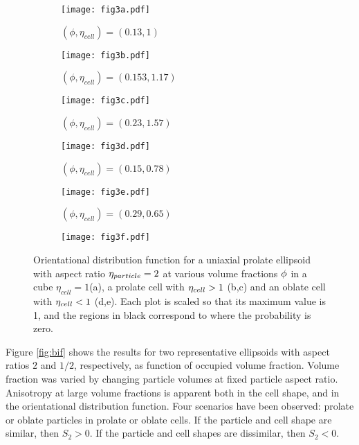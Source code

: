\documentclass{article}
\begin{document}
\begin{figure}[h]
	\centering
\begin{subfigure}[c]{0.25\linewidth}
		\centering
		\texttt{[image: fig3a.pdf]}\caption{$(\phi, \eta_{cell}) = (0.13, 1) $}
\end{subfigure}\qquad
\begin{subfigure}[c]{0.25\linewidth}
		\centering
		\texttt{[image: fig3b.pdf]}\caption{$(\phi, \eta_{cell}) = (0.153, 1.17) $}
	\end{subfigure}\qquad
\begin{subfigure}[c]{0.25\linewidth}
		\centering
		\texttt{[image: fig3c.pdf]}
		\caption{$(\phi, \eta_{cell}) = (0.23, 1.57)$} 
\end{subfigure}
\begin{subfigure}[c]{0.25\linewidth}
		\centering
		\texttt{[image: fig3d.pdf]}
		\caption{$(\phi, \eta_{cell}) =  (0.15, 0.78) $ }
\end{subfigure}\qquad
\begin{subfigure}[c]{0.25\linewidth}
		\centering
		\texttt{[image: fig3e.pdf]}\caption{$(\phi, \eta_{cell}) = (0.29, 0.65)$ }
\end{subfigure}\qquad
\begin{subfigure}[c]{0.25\linewidth}
	\centering
	\texttt{[image: fig3f.pdf]}
\end{subfigure}
\caption{Orientational distribution function for a uniaxial prolate
ellipsoid with aspect ratio $\protect\eta_{particle}=2$ at various volume
fractions $\protect\phi$ in a cube $\eta_{cell}=1$(a), a prolate cell with $\protect\eta_{cell}>1$ (b,c) and an oblate cell with $%
\protect\eta_{cell}<1$ (d,e). Each plot is scaled so that its maximum value
is 1, and the regions in black correspond to where the probability is zero. }
\label{fig:pdf}
\end{figure}

Figure \ref{fig:bif} shows the results for two representative ellipsoids
with aspect ratios $2$ and $1/2$, respectively, as function of occupied
volume fraction. Volume fraction was varied by changing particle volumes at
fixed particle aspect ratio. Anisotropy at large volume fractions is
apparent both in the cell shape, and in the orientational distribution
function. Four scenarios have been observed: prolate or oblate particles in
prolate or oblate cells. If the particle and cell shape are similar, then $%
S_{2}>0$. If the particle and cell shapes are dissimilar, then $S_{2}<0$.
\end{document}

